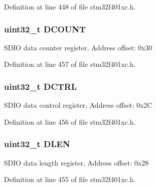 Definition at line 448 of file stm32f401xc.\+h.

\subsubsection[{\texorpdfstring{D\+C\+O\+U\+NT}{DCOUNT}}]{ uint32\+\_\+t D\+C\+O\+U\+NT}\hypertarget{struct_s_d_i_o___type_def_a4273e2b5aeb7bdf1006909b1a2b59bc8}{}\label{struct_s_d_i_o___type_def_a4273e2b5aeb7bdf1006909b1a2b59bc8}
S\+D\+IO data counter register, Address offset\+: 0x30 

Definition at line 457 of file stm32f401xc.\+h.

\subsubsection[{\texorpdfstring{D\+C\+T\+RL}{DCTRL}}]{ uint32\+\_\+t D\+C\+T\+RL}\hypertarget{struct_s_d_i_o___type_def_a96a3d1a050982fccc23c2e6dbe0de068}{}\label{struct_s_d_i_o___type_def_a96a3d1a050982fccc23c2e6dbe0de068}
S\+D\+IO data control register, Address offset\+: 0x2C 

Definition at line 456 of file stm32f401xc.\+h.

\subsubsection[{\texorpdfstring{D\+L\+EN}{DLEN}}]{ uint32\+\_\+t D\+L\+EN}\hypertarget{struct_s_d_i_o___type_def_a612edc78d2fa6288392f8ea32c36f7fb}{}\label{struct_s_d_i_o___type_def_a612edc78d2fa6288392f8ea32c36f7fb}
S\+D\+IO data length register, Address offset\+: 0x28 

Definition at line 455 of file stm32f401xc.\+h.

